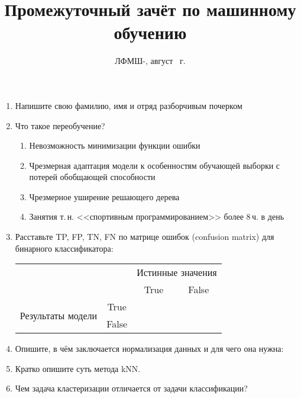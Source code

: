 \documentclass[a4paper,10pt]{article}
\title{Промежуточный зачёт по машинному обучению}
\date{ЛФМШ-\arabic{LFMSHnumber}, август {\the \year}~г.}
\begin{document}
\maketitle
\begin{enumerate}
	\item Напишите свою фамилию, имя и отряд разборчивым почерком
	\vspace{1cm}
	\item Что такое переобучение?
	\begin{enumerate}
		\item Невозможность минимизации функции ошибки
		\item Чрезмерная адаптация модели к особенностям обучающей выборки с потерей обобщающей способности
		\item Чрезмерное уширение решающего дерева
		\item Занятия т.\,н. <<спортивным программированием>> более 8\,ч. в день
	\end{enumerate}
	
	\item Расставьте TP, FP, TN, FN по матрице ошибок (confusion matrix) для бинарного классификатора:
	\begin{center}
		\begin{tabular}{ |c|c|c|c| } 
			\hline
			 \multicolumn{2}{|c|}{} & \multicolumn{2}{|c|}{Истинные значения}  \\
			 \cline{3-4} 
			 \multicolumn{2}{|c|}{} & True & False \\ 		 
			 \hline
		     \multirow{2}{5em}{Результаты модели} & True &  &  \\ 
		     \cline{2-4}
			 
			& False &  &  \\ 
			\hline
		\end{tabular}
	\end{center}	

	\item Опишите, в чём заключается нормализация данных и для чего она нужна:

	\newpage
	\item Кратко опишите суть метода kNN.
	\vspace{10cm}
	\item Чем задача кластеризации отличается от задачи классификации?
	\vspace{9cm}
	
\end{enumerate}
\end{document}
